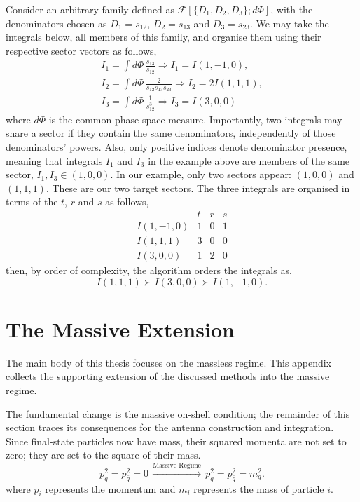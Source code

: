 Consider an arbitrary family defined as $\mathcal F[\{D_1, D_2, D_3\};d\Phi]$,
with the denominators chosen as $D_1 = s_{12}$, $D_2 = s_{13}$ and $D_3 = s_{23}$. 
We may take the integrals below, all members of this family, and organise them 
using their respective sector vectors as follows,
\begin{gather}
    I_1 = \int d\Phi\,\frac{s_{13}}{s_{12}}\Rightarrow I_1=I(1,-1,0),\\
    I_2 = \int d\Phi\,\frac2{s_{12}s_{13}s_{23}}\Rightarrow I_2=2I(1,1,1),\\
    I_3 = \int d\Phi\,\frac1{s_{12}^3}\Rightarrow I_3=I(3,0,0)
\end{gather}
where $d\Phi$ is the common phase-space measure.
Importantly, two integrals may share a sector if they contain the same denominators,
independently of those denominators' powers. Also, only positive indices denote 
denominator presence, meaning that integrals $I_1$ and $I_3$ in the example above 
are members of the same sector, $I_1, I_3\in (1,0,0)$. In our example, only two 
sectors appear: $(1,0,0)$ and $(1,1,1)$. These are our two target sectors. The 
three integrals are organised in terms of the $t$, $r$ and $s$ as follows,
\begin{equation}
    \begin{array}{c|ccc}
        & t & r & s\\
        \hline
        I(1,-1,0) & 1 & 0 & 1\\
        I(1,1,1)  & 3 & 0 & 0\\
        I(3,0,0)  & 1 & 2 & 0
    \end{array}
\end{equation}
then, by order of complexity, the algorithm orders the integrals as,
\begin{equation}
    I(1,1,1) \succ I(3,0,0) \succ I(1,-1,0).
\end{equation}

\section{The Massive Extension}\label{sec:massiveExtension}

The main body of this thesis focuses on the massless regime. This appendix
collects the supporting extension of the discussed methods into the massive regime.

The fundamental change is the massive on-shell condition; the remainder of this
section traces its consequences for the antenna construction and integration.
Since final-state particles now have mass, their squared momenta are not set to zero; they are set to the square of their mass.
\begin{equation}
    p_q^2 = p_{\bar q}^2 = 0\,\xrightarrow{\text{Massive Regime}}\, p_q^2=p_{\bar q}^2=m_q^2.
\end{equation}
where $p_i$ represents the momentum and $m_i$ represents the mass
of particle $i$.

